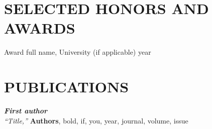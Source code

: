 \documentclass[11pt]{res} %
\newcommand{\titlegap}{5pt} %
\newcommand{\sectgap}{0.05in} %
\begin{document}
\begin{resume}
\section{SELECTED HONORS AND AWARDS}

\vspace{\titlegap} 

Award full name, University (if applicable) \hfill year \\

\vspace{\sectgap} 














\section{PUBLICATIONS}
\vspace{\titlegap}
{\bf \textit{First author}}\\
\textit{``Title,''} {\bf Authors}, bold, if, you, year, journal, volume, issue\\


\end{resume}
\end{document}
